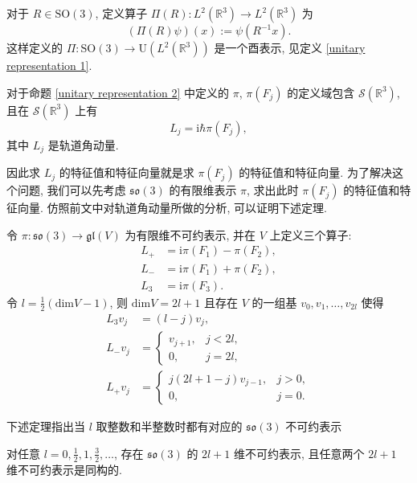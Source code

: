 \begin{proposition}
    \label{SO3L2}
    对于 $ R\in\mathrm{SO}(3) $, 定义算子 $ \Pi(R):L^2(\mathbb{R}^3)\to L^2(\mathbb{R}^3) $ 为
    \[ (\Pi(R)\psi)(x):=\psi(R^{-1}x). \]
    这样定义的 $ \Pi:\mathrm{SO}(3)\to\mathrm{U}(L^2(\mathbb{R}^3)) $ 是一个酉表示, 见定义 \ref{unitary representation 1}.

    对于命题 \ref{unitary representation 2} 中定义的 $ \pi $, $ \pi(F_j) $ 的定义域包含 $ \mathcal{S}(\mathbb{R}^3) $, 且在 $ \mathcal{S}(\mathbb{R}^3) $ 上有
    \[ L_j=\mathrm{i}\hbar\pi(F_j), \]
    其中 $ L_j $ 是轨道角动量.
\end{proposition}

因此求 $ L_j $ 的特征值和特征向量就是求 $ \pi(F_j) $ 的特征值和特征向量. 为了解决这个问题, 我们可以先考虑 $ \mathfrak{so}(3) $ 的有限维表示 $ \pi $, 求出此时 $ \pi(F_j) $ 的特征值和特征向量. 仿照前文中对轨道角动量所做的分析, 可以证明下述定理.

\begin{theorem}
    \label{so3}
    令 $ \pi:\mathfrak{so}(3)\to\mathfrak{gl}(V) $ 为有限维不可约表示, 并在 $ V $ 上定义三个算子:
    \begin{align*}
        L_+ &= \mathrm{i}\pi(F_1)-\pi(F_2),\\ 
        L_- &= \mathrm{i}\pi(F_1)+\pi(F_2),\\ 
        L_3 &= \mathrm{i}\pi(F_3).
    \end{align*}
    令 $ l=\frac{1}{2}(\mathrm{dim}V-1) $, 则 $ \mathrm{dim}V=2l+1 $ 且存在 $ V $ 的一组基 $ v_0,v_1,\dots,v_{2l} $ 使得
    \begin{align*}
        L_3v_j &= (l-j)v_j,\\ 
        L_-v_j &= \begin{cases}
            v_{j+1}, & j<2l,\\ 
            0, & j=2l,
        \end{cases}\\ 
        L_+v_j &= \begin{cases}
            j(2l+1-j)v_{j-1}, & j>0,\\ 
            0, & j=0.
        \end{cases}
    \end{align*}
\end{theorem}

下述定理指出当 $ l $ 取整数和半整数时都有对应的 $ \mathfrak{so}(3) $ 不可约表示

\begin{theorem}
    对任意 $ l=0,\frac{1}{2},1,\frac{3}{2},\dots $, 存在 $ \mathfrak{so}(3) $ 的 $ 2l+1 $ 维不可约表示, 且任意两个 $ 2l+1 $ 维不可约表示是同构的.
\end{theorem}

